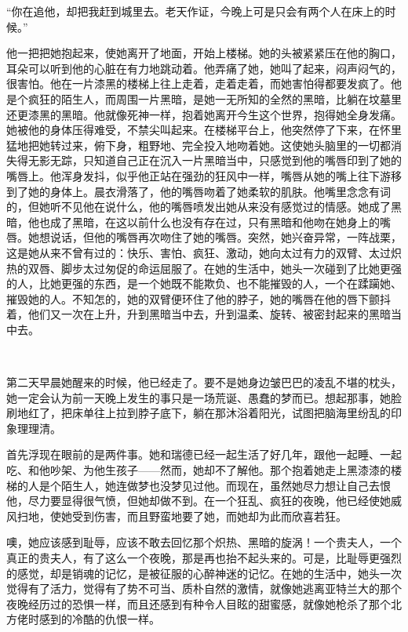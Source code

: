 \par “你在追他，却把我赶到城里去。老天作证，今晚上可是只会有两个人在床上的时候。”
\par 他一把把她抱起来，使她离开了地面，开始上楼梯。她的头被紧紧压在他的胸口，耳朵可以听到他的心脏在有力地跳动着。他弄痛了她，她叫了起来，闷声闷气的，很害怕。他在一片漆黑的楼梯上往上走着，走着走着，而她害怕得都要发疯了。他是个疯狂的陌生人，而周围一片黑暗，是她一无所知的全然的黑暗，比躺在坟墓里还更漆黑的黑暗。他就像死神一样，抱着她离开今生这个世界，抱得她全身发痛。她被他的身体压得难受，不禁尖叫起来。在楼梯平台上，他突然停了下来，在怀里猛地把她转过来，俯下身，粗野地、完全投入地吻着她。这使她头脑里的一切都消失得无影无踪，只知道自己正在沉入一片黑暗当中，只感觉到他的嘴唇印到了她的嘴唇上。他浑身发抖，似乎他正站在强劲的狂风中一样，嘴唇从她的嘴上往下游移到了她的身体上。晨衣滑落了，他的嘴唇吻着了她柔软的肌肤。他嘴里念念有词的，但她听不见他在说什么，他的嘴唇喷发出她从来没有感觉过的情感。她成了黑暗，他也成了黑暗，在这以前什么也没有存在过，只有黑暗和他吻在她身上的嘴唇。她想说话，但他的嘴唇再次吻住了她的嘴唇。突然，她兴奋异常，一阵战栗，这是她从来不曾有过的：快乐、害怕、疯狂、激动，她向太过有力的双臂、太过炽热的双唇、脚步太过匆促的命运屈服了。在她的生活中，她头一次碰到了比她更强的人，比她更强的东西，是一个她既不能欺负、也不能摧毁的人，一个在蹂躏她、摧毁她的人。不知怎的，她的双臂便环住了他的脖子，她的嘴唇在他的唇下颤抖着，他们又一次在上升，升到黑暗当中去，升到温柔、旋转、被密封起来的黑暗当中去。
\par  
\par 第二天早晨她醒来的时候，他已经走了。要不是她身边皱巴巴的凌乱不堪的枕头，她一定会认为前一天晚上发生的事只是一场荒诞、愚蠢的梦而已。想起那事，她脸刷地红了，把床单往上拉到脖子底下，躺在那沐浴着阳光，试图把脑海里纷乱的印象理理清。
\par 首先浮现在眼前的是两件事。她和瑞德已经一起生活了好几年，跟他一起睡、一起吃、和他吵架、为他生孩子——然而，她却不了解他。那个抱着她走上黑漆漆的楼梯的人是个陌生人，她连做梦也没梦见过他。而现在，虽然她尽力想让自己去恨他，尽力要显得很气愤，但她却做不到。在一个狂乱、疯狂的夜晚，他已经使她威风扫地，使她受到伤害，而且野蛮地要了她，而她却为此而欣喜若狂。
\par 噢，她应该感到耻辱，应该不敢去回忆那个炽热、黑暗的旋涡！一个贵夫人，一个真正的贵夫人，有了这么一个夜晚，那是再也抬不起头来的。可是，比耻辱更强烈的感觉，却是销魂的记忆，是被征服的心醉神迷的记忆。在她的生活中，她头一次觉得有了活力，觉得有了势不可当、质朴自然的激情，就像她逃离亚特兰大的那个夜晚经历过的恐惧一样，而且还感到有种令人目眩的甜蜜感，就像她枪杀了那个北方佬时感到的冷酷的仇恨一样。
